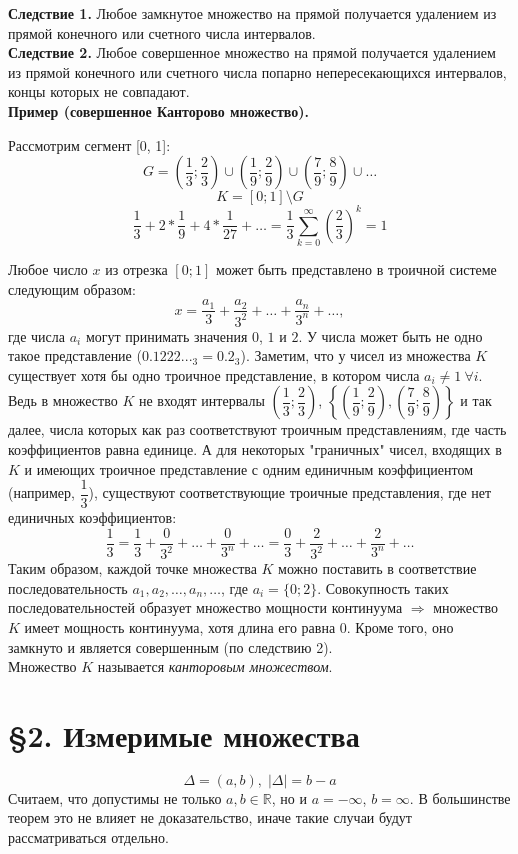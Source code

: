 \documentclass[12pt,a4paper, titlepage]{article}
\begin{document}
\textbf{Следствие 1.}
Любое замкнутое множество на прямой получается удалением из прямой конечного или счетного числа интервалов.\\

\textbf{Следствие 2.}
Любое совершенное множество на прямой получается удалением из прямой конечного или счетного числа попарно непересекающихся интервалов, концы которых не совпадают.\\

\textbf{Пример (совершенное Канторово множество).}

Рассмотрим сегмент [0, 1]:
$$
G = \left(\frac13; \frac23 \right) \cup \left(\frac19; \frac29 \right) \cup \left(\frac79; \frac89 \right) \cup \dots
$$
$$
K = [0; 1] \setminus G
$$
$$
\frac13 + 2 * \frac19 + 4 * \frac{1}{27} + \dots = \frac13 \sum^{\infty}_{k=0} \left(\frac23 \right)^k = 1
$$

Любое число $x$ из отрезка $[0; 1]$ может быть представлено в троичной системе следующим образом:
$$
x = \frac{a_1}{3} + \frac{a_2}{3^2} + \dots + \frac{a_n}{3^n} + \dots ,
$$
где числа $a_i$ могут принимать значения $0$, $1$ и $2$. У числа может быть не одно такое представление ($0.1222..._3 = 0.2_3$). Заметим, что у чисел из множества $K$ существует хотя бы одно троичное представление, в котором числа $a_i \neq 1 \ \forall i$. Ведь в множество $K$ не входят интервалы $\left(\dfrac13; \dfrac23\right)$, $\left\lbrace \left(\dfrac19; \dfrac29\right), (\dfrac79; \dfrac89)\right\rbrace$ и так далее, числа которых как раз соответствуют троичным представлениям, где часть коэффициентов равна единице. А для некоторых "граничных" чисел, входящих в $K$ и имеющих троичное представление с одним единичным коэффициентом (например, $\dfrac13$), существуют соответствующие троичные представления, где нет единичных коэффициентов:
$$
\frac13 = \frac13 + \frac{0}{3^2} + \dots + \frac{0}{3^n} + \dots = \frac03 + \frac{2}{3^2} + \dots + \frac{2}{3^n} + \dots
$$
Таким образом, каждой точке множества $K$ можно поставить в соответствие последовательность $a_1, a_2, \dots, a_n, \dots$, где $a_i = \lbrace 0; 2 \rbrace$. Совокупность таких последовательностей образует множество мощности континуума $\Rightarrow$ множество $K$ имеет мощность континуума, хотя длина его равна 0. Кроме того, оно замкнуто и является совершенным (по следствию 2).\\

Множество $K$ называется \textit{канторовым множеством}.


\section*{\S 2. Измеримые множества}
$$
\Delta = (a, b), \; |\Delta| = b - a
$$
Считаем, что допустимы не только $a,b \in \mathbb{R}$, но и $a = -\infty$, $b = \infty$. В большинстве теорем это не влияет не доказательство, иначе такие случаи будут рассматриваться отдельно.
\end{document}
